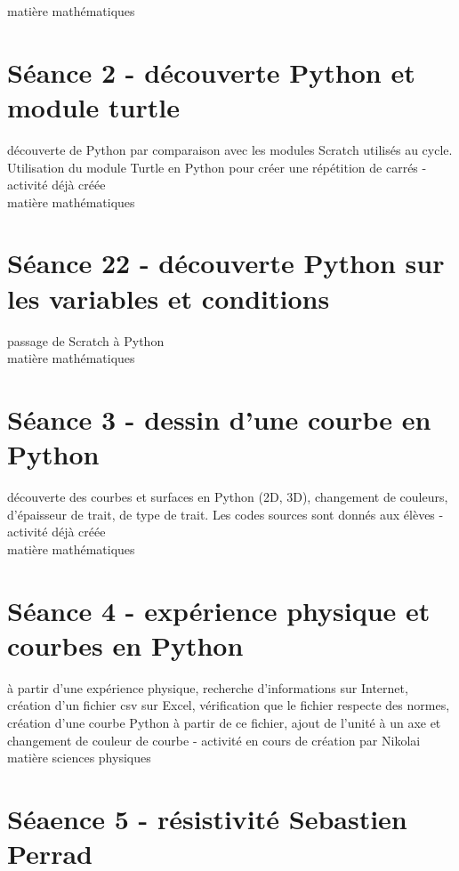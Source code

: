 \documentclass{moncours}
\begin{document}
matière mathématiques

\section{Séance 2 - découverte Python et module turtle}

découverte de Python par comparaison avec les modules Scratch utilisés au cycle. Utilisation du module Turtle en Python pour créer une répétition de carrés - activité déjà créée\\

matière mathématiques

\section{Séance 22 - découverte Python sur les variables et conditions}

passage de Scratch à Python\\

matière mathématiques

\section{Séance 3  - dessin d'une courbe en Python}

découverte des courbes et surfaces en Python (2D, 3D), changement de couleurs, d'épaisseur de trait, de type de trait. Les codes sources sont donnés aux élèves - activité déjà créée\\

matière mathématiques

\section{Séance 4 - expérience physique et courbes en Python}

 à partir d'une expérience physique, recherche d'informations sur Internet, création d'un fichier csv sur Excel, vérification que le fichier respecte des normes, création d'une courbe Python à partir de ce fichier, ajout de l'unité à un axe et changement de couleur de courbe - activité en cours de création par Nikolai\\

matière sciences physiques

\section{Séaence 5 - résistivité Sebastien Perrad}
\end{document}

